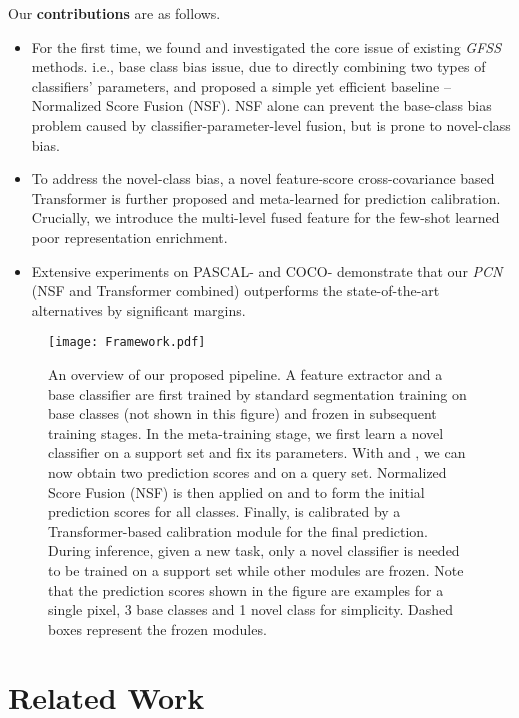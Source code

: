 \documentclass[journal]{IEEEtran}
\begin{document}
Our {\bf contributions} are as follows. 
\begin{itemize}
    \item For the first time, we found and investigated the core issue of existing \textit{GFSS} methods. i.e., base class bias issue, due to directly combining two types of classifiers' parameters, and proposed a simple yet efficient baseline -- Normalized Score Fusion (NSF). NSF alone can prevent the base-class bias problem caused by classifier-parameter-level fusion, but is prone to novel-class bias.
    \item To address the novel-class bias, a novel feature-score cross-covariance based Transformer is further proposed and meta-learned for prediction calibration. Crucially, we introduce the multi-level fused feature for the few-shot learned poor representation enrichment.
    \item Extensive experiments on PASCAL- and COCO- demonstrate that our \textit{PCN} (NSF and Transformer combined) outperforms the state-of-the-art alternatives by significant margins.
\end{itemize}


\begin{figure*}[ht]
    \centering
    \texttt{[image: Framework.pdf]}
    \caption{An overview of our proposed pipeline. 
    A feature extractor  and a base classifier  are first trained by standard segmentation training on base classes (not shown in this figure) and frozen in subsequent training stages.
    In the meta-training stage, we first learn a novel classifier  on a support set and fix its parameters.
    With  and , we can now obtain two prediction scores  and  on a query set.
    Normalized Score Fusion (NSF) is then applied on  and  to form the initial prediction scores  for all classes.
    Finally,  is calibrated by a Transformer-based calibration module for the final prediction. 
    During inference, given a new task, only a novel classifier is needed to be trained on a support set while other modules are frozen.
    Note that the prediction scores shown in the figure are examples for a single pixel, 3 base classes and 1 novel class for simplicity.
    Dashed boxes represent the frozen modules.}
    \label{fig:framework}
\end{figure*}

\section{Related Work}
\end{document}
